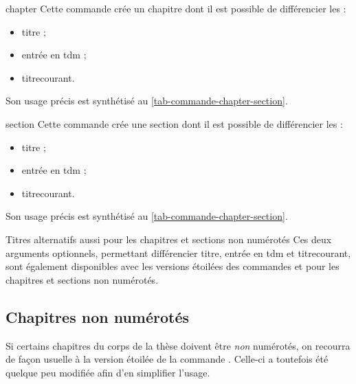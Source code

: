 \begin{docCommand}{chapter}{}
  Cette commande crée un chapitre dont il est possible de différencier les :
  \begin{itemize}
  \item titre ;
  \item entrée en \gls{tdm}\signet{} ;
  \item \gls{titrecourant}.
  \end{itemize}
  Son usage précis est synthétisé au \vref{tab-commande-chapter-section}.
\end{docCommand}
%
\begin{docCommand}{section}{}
  Cette commande crée une section dont il est possible de différencier les :
  \begin{itemize}
  \item titre ;
  \item entrée en \gls{tdm}\signet{} ;
  \item \gls{titrecourant}.
  \end{itemize}
  Son usage précis est synthétisé au \vref{tab-commande-chapter-section}.
\end{docCommand}
%
\begin{dbremark}{Titres alternatifs aussi pour les chapitres et sections non
    numérotés}{}
  Ces deux arguments optionnels, permettant différencier titre, entrée en
  \gls{tdm} et \gls{titrecourant}, sont également disponibles avec les versions
  étoilées des commandes  et  pour
  les chapitres et sections non numérotés.
\end{dbremark}
%
\begin{table}[hb]
  \centering
  \caption{Usage des (deux arguments optionnels des) commandes
    \protect{} et \protect{}}
  \label{tab-commande-chapter-section}
  
\end{table}

\subsection{Chapitres non numérotés}
\label{sec-chap-non-numer}%
%

Si certains chapitres du corps de la thèse  doivent être \emph{non} numérotés, on recourra de
façon usuelle à la version étoilée de la commande
. Celle-ci a toutefois été quelque peu modifiée afin
d'en simplifier l'usage.

